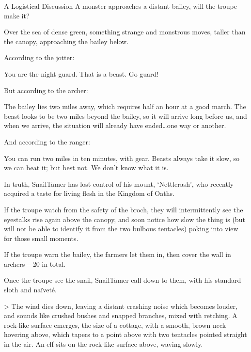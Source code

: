 
{A Logistical Discussion}%
{A monster approaches a distant bailey, will the troupe make it?}%

Over the sea of dense green, something strange and monstrous moves, taller than the canopy, approaching the bailey below.

According to the \gls{jotter}:

\begin{speechtext}
  You are the night guard.  That is a beast.  Go guard!
\end{speechtext}

But according to the archer:

\begin{speechtext}
  The bailey lies two miles away, which requires half an hour at a good march.
  The beast looks to be two miles beyond the bailey, so it will arrive long before us, and when we arrive, the situation will already have ended\ldots one way or another.
\end{speechtext}

And according to the ranger:

\begin{speechtext}
  You can run two miles in ten minutes, with gear.
  Beasts always take it slow, so we can beat it; but best not.
  We don't know what it is.
\end{speechtext}

In truth, \gls{SnailTamer} has lost control of his mount, `Nettlerash', who recently acquired a taste for living flesh in the Kingdom of Oaths.

If the troupe watch from the safety of the broch,
they will intermittently see the eyestalks rise again above the canopy, and soon notice how slow the thing is (but will not be able to identify it from the two bulbous tentacles) poking into view for those small moments.

If the troupe warn the bailey,
the farmers let them in, then cover the wall in archers -- 20 in total.

Once the troupe see the snail,
\gls{SnailTamer} call down to them, with his standard sloth and naïveté.

> The wind dies down, leaving a distant crashing noise which becomes louder, and sounds like crushed bushes and snapped branches, mixed with  retching.  A rock-like surface emerges, the size of a cottage, with a smooth, brown neck hovering above, which tapers to a point above with two tentacles pointed straight in the air.  An elf sits on the rock-like surface above, waving slowly.

